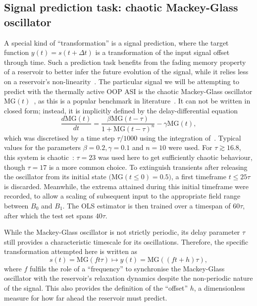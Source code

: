 \subsection{Signal prediction task: chaotic Mackey-Glass oscillator} \label{sec:3:Thermal_Prediction}
A special kind of ``transformation'' is a signal prediction, where the target function $y(t) = s(t + \Delta t)$ is a transformation of the input signal offset through time.
Such a prediction task benefits from the fading memory property of a reservoir to better infer the future evolution of the signal, while it relies less on a reservoir's non-linearity~\cite{TaskAdaptivePRC,NeuromorphicFewShot}.
The particular signal we will be attempting to predict with the thermally active OOP ASI is the chaotic Mackey-Glass oscillator $\mathrm{MG}(t)$~\cite{MackeyGlass}, as this is a popular benchmark in literature~\cite{RotatingNeuronsRC,AdaptiveProgrammableRC,TaskAdaptivePRC,Moon_2021,JaegerHaasWireless,ArchitecturalMarkovianESN}.
It can not be written in closed form; instead, it is implicitly defined by the delay-differential equation
\begin{equation}
	\label{eq:3:MG}
	\frac{d\mathrm{MG}(t)}{dt} = \frac{\beta \mathrm{MG}(t - \tau)}{1 + \mathrm{MG}(t - \tau)^n} - \gamma \mathrm{MG}(t) \mathrm{,}
\end{equation}
which was discretised by a time step $\tau/1000$ using the integration of~.
Typical values for the parameters $\beta=0.2, \gamma=0.1$ and $n=10$ were used.
For $\tau \gtrsim 16.8$, this system is chaotic~\cite{jaeger2001echo}: $\tau=23$ was used here to get sufficiently chaotic behaviour, though $\tau=17$ is a more common choice.
To extinguish transients after releasing the oscillator from its initial state $\big(\mathrm{MG}(t \leq 0) = 0.5\big)$, a first timeframe $t \leq 25\tau$ is discarded.
Meanwhile, the extrema attained during this initial timeframe were recorded, to allow a scaling of subsequent input to the appropriate field range between $B_0$ and $B_1$.
The OLS estimator is then trained over a timespan of $60\tau$, after which the test set spans $40\tau$. \par
While the Mackey-Glass oscillator is not strictly periodic, its delay parameter $\tau$ still provides a characteristic timescale for its oscillations.
Therefore, the specific transformation attempted here is written as
\begin{equation}
	s(t) = \mathrm{MG}(ft\tau) \mapsto y(t) = \mathrm{MG}((ft + h)\tau) \mathrm{,}
\end{equation}
where $f$ fulfils the role of a ``frequency'' to synchronise the Mackey-Glass oscillator with the reservoir's relaxation dynamics despite the non-periodic nature of the signal.
This also provides the definition of the ``offset'' $h$, a dimensionless measure for how far ahead the reservoir must predict. \\\par

